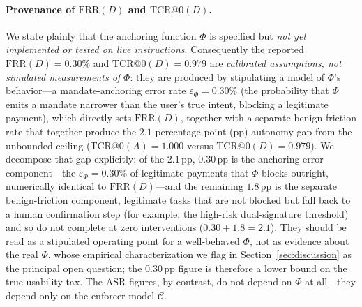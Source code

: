 \documentclass[10pt,twocolumn,letterpaper]{article}
\begin{document}
\paragraph{Provenance of $\mathrm{FRR}(D)$ and $\mathrm{TCR@0}(D)$.} We state plainly that the anchoring function $\Phi$ is specified but \emph{not yet implemented or tested on live instructions}. Consequently the reported $\mathrm{FRR}(D)=0.30\%$ and $\mathrm{TCR@0}(D)=0.979$ are \emph{calibrated assumptions, not simulated measurements of $\Phi$}: they are produced by stipulating a model of $\Phi$'s behavior---a mandate-anchoring error rate $\varepsilon_\Phi=0.30\%$ (the probability that $\Phi$ emits a mandate narrower than the user's true intent, blocking a legitimate payment), which directly sets $\mathrm{FRR}(D)$, together with a separate benign-friction rate that together produce the $2.1$ percentage-point (pp) autonomy gap from the unbounded ceiling ($\mathrm{TCR@0}(A)=1.000$ versus $\mathrm{TCR@0}(D)=0.979$). We decompose that gap explicitly: of the $2.1$\,pp, $0.30$\,pp is the anchoring-error component---the $\varepsilon_\Phi=0.30\%$ of legitimate payments that $\Phi$ blocks outright, numerically identical to $\mathrm{FRR}(D)$---and the remaining $1.8$\,pp is the separate benign-friction component, legitimate tasks that are not blocked but fall back to a human confirmation step (for example, the high-risk dual-signature threshold) and so do not complete at zero interventions ($0.30+1.8=2.1$). They should be read as a stipulated operating point for a well-behaved $\Phi$, not as evidence about the real $\Phi$, whose empirical characterization we flag in Section~\ref{sec:discussion} as the principal open question; the $0.30$\,pp figure is therefore a lower bound on the true usability tax. The ASR figures, by contrast, do not depend on $\Phi$ at all---they depend only on the enforcer model $\mathcal{C}$.
\end{document}
